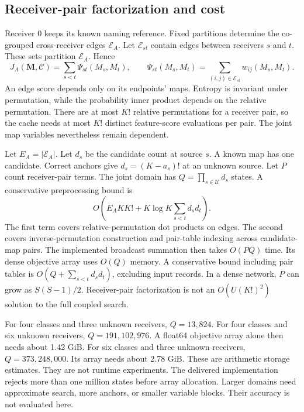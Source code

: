 \documentclass[10pt,a4paper]{article}
\begin{document}
\subsection{Receiver-pair factorization and cost}
Receiver 0 keeps its known naming reference. Fixed partitions determine the co-grouped cross-receiver edges $\mathcal E_A$. Let $\mathcal E_{st}$ contain edges between receivers $s$ and $t$. These sets partition $\mathcal E_A$. Hence
\[
 J_A(\mathbf M,\mathcal C)=\sum_{s<t}\Psi_{st}(M_s,M_t),\qquad
 \Psi_{st}(M_s,M_t)=\sum_{(i,j)\in\mathcal E_{st}}w_{ij}(M_s,M_t).
\]
An edge score depends only on its endpoints' maps. Entropy is invariant under permutation, while the probability inner product depends on the relative permutation. There are at most $K!$ relative permutations for a receiver pair, so the cache needs at most $K!$ distinct feature-score evaluations per pair. The joint map variables nevertheless remain dependent.

Let $E_A=|\mathcal E_A|$. Let $d_s$ be the candidate count at source $s$. A known map has one candidate. Correct anchors give $d_s=(K-a_s)!$ at an unknown source. Let $P$ count receiver-pair terms. The joint domain has $Q=\prod_{s\in\mathcal U}d_s$ states. A conservative preprocessing bound is
\[
 O\!\left(E_A K K!+K\log K\sum_{s<t}d_s d_t\right).
\]
The first term covers relative-permutation dot products on edges. The second covers inverse-permutation construction and pair-table indexing across candidate-map pairs. The implemented broadcast summation then takes $O(PQ)$ time. Its dense objective array uses $O(Q)$ memory. A conservative bound including pair tables is $O(Q+\sum_{s<t}d_sd_t)$, excluding input records. In a dense network, $P$ can grow as $S(S-1)/2$. Receiver-pair factorization is not an $O(U(K!)^2)$ solution to the full coupled search.

For four classes and three unknown receivers, $Q=13{,}824$. For four classes and six unknown receivers, $Q=191{,}102{,}976$. A float64 objective array alone then needs about 1.42 GiB. For six classes and three unknown receivers, $Q=373{,}248{,}000$. Its array needs about 2.78 GiB. These are arithmetic storage estimates. They are not runtime experiments. The delivered implementation rejects more than one million states before array allocation. Larger domains need approximate search, more anchors, or smaller variable blocks. Their accuracy is not evaluated here.
\end{document}
